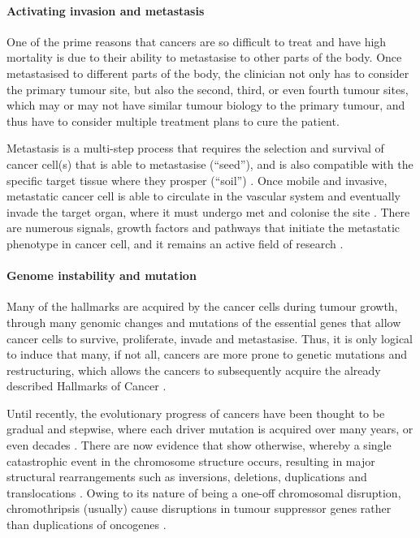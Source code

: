 \paragraph{Activating invasion and metastasis}

\noindent
One of the prime reasons that cancers are so difficult to treat and have high mortality is due to their ability to metastasise to other parts of the body.
Once metastasised to different parts of the body, the clinician not only has to consider the primary tumour site, but also the second, third, or even fourth tumour sites, which may or may not have similar tumour biology to the primary tumour, and thus have to consider multiple treatment plans to cure the patient.

Metastasis is a multi-step process that requires the selection and survival of cancer cell(s) that is able to metastasise (``seed''), and is also compatible with the specific target tissue where they prosper (``soil'') \citep{Talmadge2010}.
Once mobile and invasive, metastatic cancer cell is able to circulate in the vascular system and eventually invade the target organ, where it must undergo \gls{met} and colonise the site \citep{Hanahan2011,Kalluri2009}.
There are numerous signals, growth factors and pathways that initiate the metastatic phenotype in cancer cell, and it remains an active field of research \citep{Hanahan2011,Kalluri2009}.

\paragraph{Genome instability and mutation}

\noindent
Many of the hallmarks are acquired by the cancer cells during tumour growth, through many genomic changes and mutations of the essential genes that allow cancer cells to survive, proliferate, invade and metastasise.
Thus, it is only logical to induce that many, if not all, cancers are more prone to genetic mutations and restructuring, which allows the cancers to subsequently acquire the already described Hallmarks of Cancer \citep{Hanahan2011}.

Until recently, the evolutionary progress of cancers have been thought to be gradual and stepwise, where each driver mutation is acquired over many years, or even decades \citep{Stephens2011}.
There are now evidence that show otherwise, whereby a single catastrophic event in the chromosome structure occurs, resulting in major structural rearrangements such as inversions, deletions, duplications and translocations \citep{Leibowitz2015,Stephens2011}.
Owing to its nature of being a one-off chromosomal disruption, chromothripsis (usually) cause disruptions in tumour suppressor genes rather than duplications of oncogenes \citep{Leibowitz2015}.

